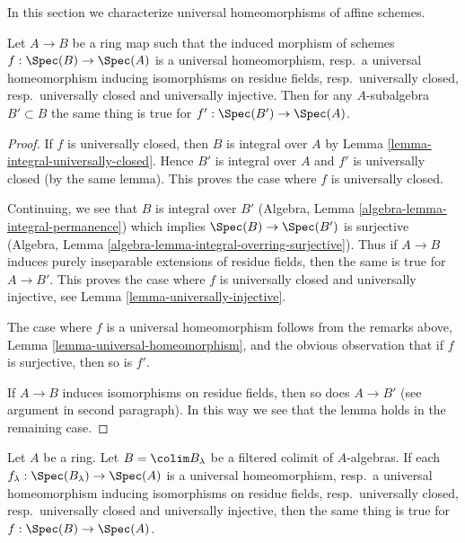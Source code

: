 \noindent
In this section we characterize universal homeomorphisms of affine schemes.

\begin{lemma}
\label{lemma-subalgebra-inherits}
Let $A \to B$ be a ring map such that the induced morphism of
schemes $f : \Spec(B) \to \Spec(A)$ is a universal homeomorphism,
resp.\ a universal homeomorphism inducing isomorphisms on residue fields,
resp.\ universally closed,
resp.\ universally closed and universally injective.
Then for any $A$-subalgebra $B' \subset B$
the same thing is true for $f' : \Spec(B') \to \Spec(A)$.
\end{lemma}

\begin{proof}
If $f$ is universally closed, then
$B$ is integral over $A$ by Lemma \ref{lemma-integral-universally-closed}.
Hence $B'$ is integral over $A$ and $f'$
is universally closed (by the same lemma).
This proves the case where $f$ is universally closed.

\medskip\noindent
Continuing, we see that $B$ is integral over $B'$ 
(Algebra, Lemma \ref{algebra-lemma-integral-permanence})
which implies $\Spec(B) \to \Spec(B')$ is surjective
(Algebra, Lemma \ref{algebra-lemma-integral-overring-surjective}).
Thus if $A \to B$ induces purely inseparable extensions of residue fields,
then the same is true for $A \to B'$. This proves the case
where $f$ is universally closed and universally injective, see
Lemma \ref{lemma-universally-injective}.

\medskip\noindent
The case where $f$ is a universal homeomorphism follows from
the remarks above, Lemma \ref{lemma-universal-homeomorphism},
and the obvious observation that if $f$ is surjective, then so is $f'$.

\medskip\noindent
If $A \to B$ induces isomorphisms on residue fields, then
so does $A \to B'$ (see argument in second paragraph).
In this way we see that the lemma holds in the remaining case.
\end{proof}

\begin{lemma}
\label{lemma-colimit-inherits}
Let $A$ be a ring. Let $B = \colim B_\lambda$ be a filtered colimit
of $A$-algebras. If each $f_\lambda : \Spec(B_\lambda) \to \Spec(A)$
is a universal homeomorphism,
resp.\ a universal homeomorphism inducing isomorphisms on residue fields,
resp.\ universally closed,
resp.\ universally closed and universally injective,
then the same thing is true for $f : \Spec(B) \to \Spec(A)$.
\end{lemma}

